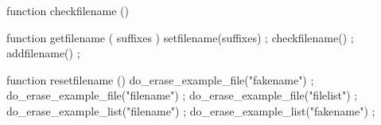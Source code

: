     function checkfilename () {
    }

    function getfilename ( suffixes ) {
        setfilename(suffixes) ;
        checkfilename() ;
        addfilename() ;
    }

    function resetfilename () {
        do_erase_example_file("fakename") ;
        do_erase_example_file("filename") ;
        do_erase_example_file("filelist") ;
        do_erase_example_list("filename") ;
        do_erase_example_list("fakename") ;
    }

\stopJSpreamble

\endinput
